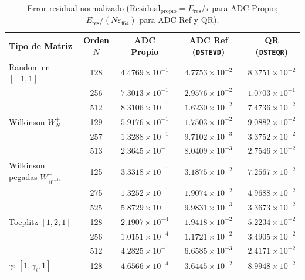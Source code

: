 \documentclass[11pt,a4paper]{article}
\begin{document}
\begin{table}[htbp]
    \centering
    \caption{Error residual normalizado ($\text{Residual}_{\text{propio}} = E_{\text{res}} / \tau$ para ADC Propio; $E_{\text{res}} / (N\varepsilon_{\text{f64}})$ para ADC Ref y QR).}
    \label{tab:residuo}
    \begin{tabular}{@{} l c c c c @{}}
        \toprule
        \textbf{Tipo de Matriz} & \textbf{Orden $N$} & \textbf{ADC Propio} & \textbf{ADC Ref (\texttt{DSTEVD})} & \textbf{QR (\texttt{DSTEQR})} \\
        \midrule
        Random en $[-1, 1]$ & 128 & $4.4769 \times 10^{-1}$ & $4.7753 \times 10^{-2}$ & $8.3751 \times 10^{-2}$ \\
                            & 256 & $7.3013 \times 10^{-1}$ & $2.9576 \times 10^{-2}$ & $1.0703 \times 10^{-1}$ \\
                            & 512 & $8.3106 \times 10^{-1}$ & $1.6230 \times 10^{-2}$ & $7.4736 \times 10^{-2}$ \\
        \midrule
        Wilkinson $W_N^+$   & 129 & $5.9176 \times 10^{-1}$ & $1.7503 \times 10^{-2}$ & $9.0882 \times 10^{-2}$ \\
                            & 257 & $1.3288 \times 10^{-1}$ & $9.7102 \times 10^{-3}$ & $3.3752 \times 10^{-2}$ \\
                            & 513 & $2.3645 \times 10^{-1}$ & $8.0409 \times 10^{-3}$ & $2.7546 \times 10^{-2}$ \\
        \midrule
        Wilkinson pegadas $W_{10^{-14}}^+$ & 125 & $3.3318 \times 10^{-1}$ & $3.1875 \times 10^{-2}$ & $7.2567 \times 10^{-2}$ \\
                            & 275 & $1.3252 \times 10^{-1}$ & $1.9074 \times 10^{-2}$ & $4.9688 \times 10^{-2}$ \\
                            & 525 & $5.8729 \times 10^{-1}$ & $9.9831 \times 10^{-3}$ & $3.3673 \times 10^{-2}$ \\
        \midrule
        Toeplitz $[1, 2, 1]$ & 128 & $2.1907 \times 10^{-4}$ & $1.9418 \times 10^{-2}$ & $5.2234 \times 10^{-2}$ \\
                            & 256 & $1.0151 \times 10^{-4}$ & $1.1721 \times 10^{-2}$ & $3.4905 \times 10^{-2}$ \\
                            & 512 & $4.2825 \times 10^{-1}$ & $6.6585 \times 10^{-3}$ & $2.4171 \times 10^{-2}$ \\
        \midrule
        $\gamma$: $[1, \gamma_i, 1]$ & 128 & $4.6566 \times 10^{-4}$ & $3.6445 \times 10^{-2}$ & $8.9948 \times 10^{-2}$ \\

\end{tabular}
\end{table}
\end{document}
